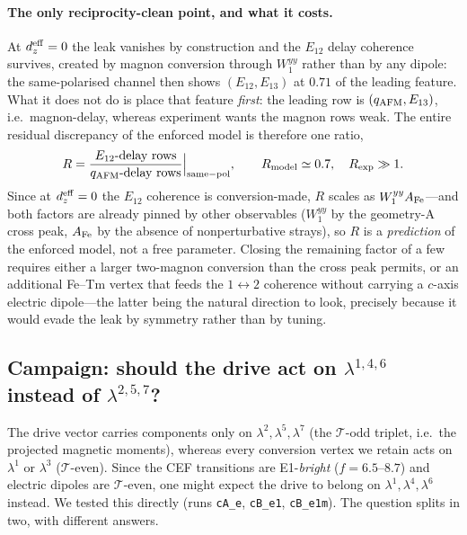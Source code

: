 \documentclass[11pt]{article}
\newcommand{\qafm}{q_{\rm AFM}}
\begin{document}
\paragraph{The only reciprocity-clean point, and what it costs.}
At $d_z^{\rm eff}=0$ the leak vanishes by construction and the
$E_{12}$ delay coherence survives, created by magnon conversion through
$W^{yy}_1$ rather than by any dipole: the same-polarised channel then
shows $(E_{12},E_{13})$ at $0.71$ of the leading feature.  What it does
not do is place that feature \emph{first}: the leading row is
$(\qafm,E_{13})$, i.e.\ magnon-delay, whereas experiment wants the
magnon rows weak.  The entire residual discrepancy of the enforced
model is therefore one ratio,
\begin{equation}
  R=\frac{\text{$E_{12}$-delay rows}}{\text{$\qafm$-delay rows}}
  \Big|_{\rm same-pol}, \qquad
  R_{\rm model}\simeq0.7,\quad R_{\rm exp}\gg1 .
\end{equation}
Since at $d_z^{\rm eff}=0$ the $E_{12}$ coherence is conversion-made,
$R$ scales as $W^{yy}_1A_{\rm Fe}$---and both factors are already pinned
by other observables ($W^{yy}_1$ by the geometry-A cross peak,
$A_{\rm Fe}$ by the absence of nonperturbative strays), so $R$ is a
\emph{prediction} of the enforced model, not a free parameter.  Closing
the remaining factor of a few requires either a larger two-magnon
conversion than the cross peak permits, or an additional Fe--Tm vertex
that feeds the $1\!\leftrightarrow\!2$ coherence without carrying a
$c$-axis electric dipole---the latter being the natural direction to
look, precisely because it would evade the leak by symmetry rather than
by tuning.

\subsection{Campaign: should the drive act on $\lambda^{1,4,6}$ instead of
$\lambda^{2,5,7}$?}
\label{si:drivecampaign}

The drive vector carries components only on $\lambda^2,\lambda^5,\lambda^7$
(the $\mathcal T$-odd triplet, i.e.\ the projected magnetic moments), whereas
every conversion vertex we retain acts on $\lambda^1$ or $\lambda^3$ ($\mathcal
T$-even).  Since the CEF transitions are E1-\emph{bright}
($f=6.5$--$8.7$) and electric dipoles are $\mathcal T$-even, one might expect
the drive to belong on $\lambda^1,\lambda^4,\lambda^6$ instead.  We tested
this directly (runs \texttt{cA\_e}, \texttt{cB\_e1}, \texttt{cB\_e1m}).  The
question splits in two, with different answers.
\end{document}
